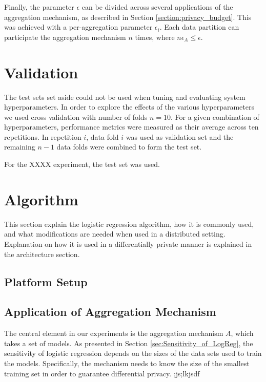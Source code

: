 Finally, the parameter $\epsilon$ can be divided across several applications of the aggregation mechanism, as described in Section \ref{section:privacy_budget}. This was achieved with a per-aggregation parameter $\epsilon_i$. Each data partition can participate the aggregation mechanism $n$ times, where $n\epsilon_A \leq \epsilon$.


\section{Validation}

The test sets set aside could not be used when tuning and evaluating system hyperparameters. In order to explore the effects of the various hyperparameters we used cross validation with number of folds $n=10$. For a given combination of hyperparameters, performance metrics were measured as their average across ten repetitions. In repetition $i$, data fold $i$ was used as validation set and the remaining $n-1$ data folds were combined to form the test set.

For the XXXX experiment, the test set was used.

\section{Algorithm}

This section explain the logistic regression algorithm, how it is commonly used, and what modifications are needed when used in a distributed setting. Explanation on how it is used in a differentially private manner is explained in the architecture section. 

\subsection{Platform Setup}

\subsection{Application of Aggregation Mechanism}

The central element in our experiments is the aggregation mechanism $A$, which takes a set of models. As presented in Section \ref{sec:Sensitivity_of_LogReg}, the sensitivity of logistic regression depends on the sizes of the data sets used to train the models. Specifically, the mechanism needs to know the size of the smallest training set in order to guarantee differential privacy. ;js;lkjsdf

